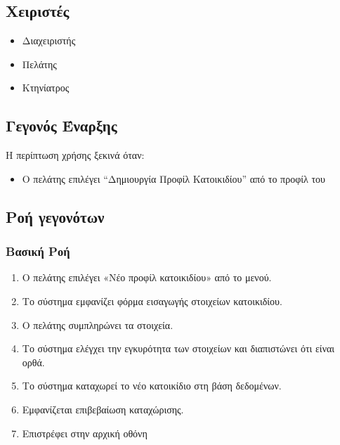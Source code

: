 \documentclass[12pt,a4paper,twoside]{book}
\begin{document}
\subsection{Χειριστές}
\begin{itemize}
  \item Διαχειριστής
  \item Πελάτης
  \item Κτηνίατρος
\end{itemize}

\subsection{Γεγονός Έναρξης}
Η περίπτωση χρήσης ξεκινά όταν:
\begin{itemize}
  \item Ο πελάτης επιλέγει “Δημιουργία Προφίλ Κατοικιδίου” από το προφίλ του   %
\end{itemize}

\subsection{Ροή γεγονότων}

\subsubsection{Βασική Ροή}
\begin{enumerate}
  \item Ο πελάτης επιλέγει «Νέο προφίλ κατοικιδίου» από το μενού.  %
  \item Το σύστημα εμφανίζει φόρμα εισαγωγής στοιχείων κατοικιδίου.  %
  \item Ο πελάτης συμπληρώνει τα στοιχεία.   %
  \item Το σύστημα ελέγχει την εγκυρότητα των στοιχείων και διαπιστώνει ότι είναι ορθά.  %
  \item Το σύστημα καταχωρεί το νέο κατοικίδιο στη βάση δεδομένων.  %
  \item Εμφανίζεται επιβεβαίωση καταχώρισης.  %
  \item Επιστρέφει στην αρχική οθόνη    %
\end{enumerate}
\end{document}
